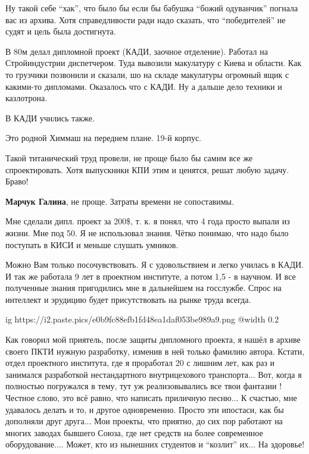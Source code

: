 \begin{itemize}

Ну такой себе \enquote{хак}, что было бы если бы бабушка \enquote{божий одуванчик} погнала вас
из архива. Хотя справедливости ради надо сказать, что \enquote{победителей} не судят и
цель была достигнута.


В 80м делал дипломной проект (КАДИ, заочное отделение). Работал на
Стройиндустрии диспетчером. Туда вывозили макулатуру с Киева и области. Как то
грузчики позвонили и сказали, шо на складе макулатуры огромный ящик с какими-то
дипломами. Оказалось что с КАДИ. Ну а дальше дело техники и казлотрона.

В КАДИ учились также.

Это родной Химмаш на переднем плане. 19-й корпус.


Такой титанический труд провели, не проще было бы самим все же спроектировать.
Хотя выпускники КПИ этим и ценятся, решат любую задачу. Браво!

\begin{itemize} %
\textbf{Марчук Галина}, не проще. Затраты времени не сопоставимы.
\end{itemize} %


Мне сделали дипл. проект за 200\$, т. к. я понял, что 4 года просто выпали из
жизни. Мне под 50. Я не использовал знания. Чётко понимаю, что надо было поступать
в КИСИ и меньше слушать умников.

\begin{itemize} %

Можно Вам только посочувствовать. Я с удовольствием и легко училась в КАДИ. И
так же работала 9 лет в проектном институте, а потом 1,5 - в научном. И все
полученные знания пригодились мне в дальнейшем на госслужбе. Спрос на интеллект
и эрудицию будет присутствовать на рынке труда всегда.

\end{itemize} %


\ifcmt
  ig https://i2.paste.pics/e0b9fc88efb1fd48ea1daf053be989a9.png
  @width 0.2
\fi


Как говорил мой приятель, после защиты дипломного проекта, я нашёл в архиве
своего ПКТИ нужную разработку, изменив в ней только фамилию автора. Кстати,
отдел проектного института, где я проработал 20 с лишним лет, как раз и
занимался разработкой нестандартного внутрицехового транспорта... Вот, когда я
полностью погружался в тему, тут уж реализовывались все твои фантазии ! Честное
слово, это всё равно, что написать приличную песню... К счастью, мне удавалось
делать и то, и другое одновременно. Просто эти ипостаси, как бы дополняли друг
друга... Мои проекты, что приятно, до сих пор работают на многих заводах бывшего
Союза, где нет средств на более современное оборудование.... Может, кто из
нынешних студентов и \enquote{козлит} их... На здоровье!



\end{itemize}
